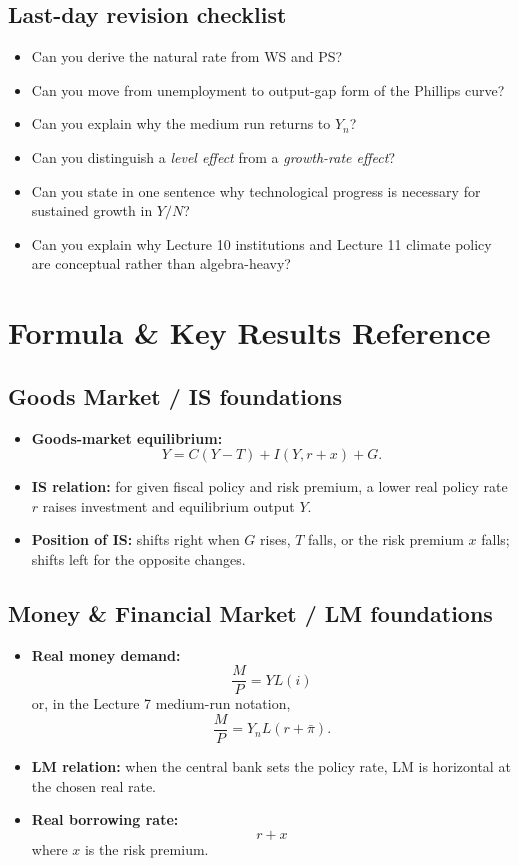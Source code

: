 \documentclass[12pt]{article}
\begin{document}
\subsection{Last-day revision checklist}

\begin{itemize}[leftmargin=1.5em]
\item Can you derive the natural rate from WS and PS?
\item Can you move from unemployment to output-gap form of the Phillips curve?
\item Can you explain why the medium run returns to $Y_n$?
\item Can you distinguish a \emph{level effect} from a \emph{growth-rate effect}?
\item Can you state in one sentence why technological progress is necessary for sustained growth in $Y/N$?
\item Can you explain why Lecture 10 institutions and Lecture 11 climate policy are conceptual rather than algebra-heavy?
\end{itemize}

\newpage



\section{Formula \& Key Results Reference}

\subsection*{Goods Market / IS foundations}
\begin{itemize}[leftmargin=1.5em]
\item \textbf{Goods-market equilibrium:}
\[
Y = C(Y-T)+I(Y,r+x)+G.
\]
\item \textbf{IS relation:} for given fiscal policy and risk premium, a lower real policy rate $r$ raises investment and equilibrium output $Y$.
\item \textbf{Position of IS:} shifts right when $G$ rises, $T$ falls, or the risk premium $x$ falls; shifts left for the opposite changes.
\end{itemize}

\subsection*{Money \& Financial Market / LM foundations}
\begin{itemize}[leftmargin=1.5em]
\item \textbf{Real money demand:}
\[
\frac{M}{P}=YL(i)
\]
or, in the Lecture 7 medium-run notation,
\[
\frac{M}{P}=Y_nL(r+\bar{\pi}).
\]
\item \textbf{LM relation:} when the central bank sets the policy rate, LM is horizontal at the chosen real rate.
\item \textbf{Real borrowing rate:}
\[
r+x
\]
where $x$ is the risk premium.
\end{itemize}
\end{document}
